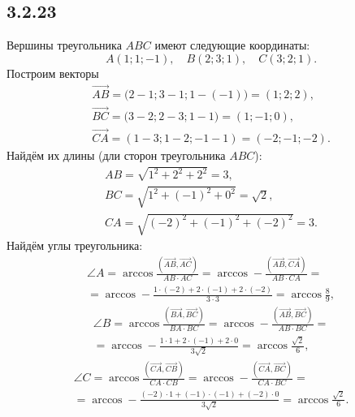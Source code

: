 \subsection{3.2.23}

Вершины треугольника $ABC$ имеют следующие координаты:
\[
A(1;1;-1),\quad B(2;3;1),\quad C(3;2;1).
\]
Построим векторы
\begin{gather*}
\overrightarrow{AB}=\bigl(2-1;3-1;1-(-1)\bigr)=(1;2;2), \\
\overrightarrow{BC}=\bigl(3-2;2-3;1-1\bigr)=(1;-1;0), \\
\overrightarrow{CA}=(1-3;1-2;-1-1)=(-2;-1;-2).
\end{gather*}
Найдём их длины (дли сторон треугольника $ABC$):
\begin{gather*}
AB=\sqrt{1^2+2^2+2^2}=3, \\
BC=\sqrt{1^2+(-1)^2+0^2}=\sqrt{2}, \\
CA=\sqrt{(-2)^2+(-1)^2+(-2)^2}=3.
\end{gather*}
Найдём углы треугольника:
\begin{multline*}
\angle A=\arccos\frac{\left(\overrightarrow{AB},\overrightarrow{AC}\right)}{AB\cdot AC}=\arccos-\frac{\left(\overrightarrow{AB},\overrightarrow{CA}\right)}{AB\cdot CA}= \\
=\arccos-\frac{1\cdot(-2)+2\cdot(-1)+2\cdot(-2)}{3\cdot3}=\arccos\frac{8}{9},
\end{multline*}
\begin{multline*}
\angle B=\arccos\frac{\left(\overrightarrow{BA},\overrightarrow{BC}\right)}{BA\cdot BC}=\arccos-\frac{\left(\overrightarrow{AB},\overrightarrow{BC}\right)}{AB\cdot BC}= \\
=\arccos-\frac{1\cdot1+2\cdot(-1)+2\cdot0}{3\sqrt{2}}=\arccos\frac{\sqrt{2}}{6},
\end{multline*}
\begin{multline*}
\angle C=\arccos\frac{\left(\overrightarrow{CA},\overrightarrow{CB}\right)}{CA\cdot CB}=\arccos-\frac{\left(\overrightarrow{CA},\overrightarrow{BC}\right)}{CA\cdot BC}= \\
=\arccos-\frac{(-2)\cdot1+(-1)\cdot(-1)+(-2)\cdot0}{3\sqrt{2}}=\arccos\frac{\sqrt{2}}{6}.
\end{multline*}

